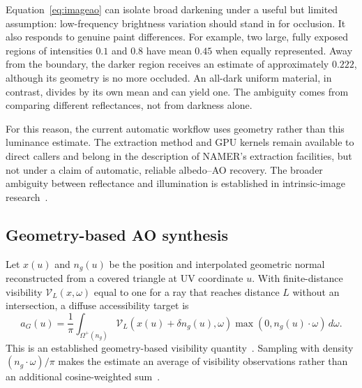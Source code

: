 \documentclass[11pt,letterpaper]{article}
\begin{document}
Equation~\eqref{eq:imageao} can isolate broad darkening under a useful but limited assumption: low-frequency brightness variation should stand in for occlusion. It also responds to genuine paint differences. For example, two large, fully exposed regions of intensities $0.1$ and $0.8$ have mean $0.45$ when equally represented. Away from the boundary, the darker region receives an estimate of approximately $0.222$, although its geometry is no more occluded. An all-dark uniform material, in contrast, divides by its own mean and can yield one. The ambiguity comes from comparing different reflectances, not from darkness alone.

For this reason, the current automatic workflow uses geometry rather than this luminance estimate. The extraction method and GPU kernels remain available to direct callers and belong in the description of NAMER's extraction facilities, but not under a claim of automatic, reliable albedo--AO recovery. The broader ambiguity between reflectance and illumination is established in intrinsic-image research~\cite{barron2015}.

\subsection{Geometry-based AO synthesis}
Let $x(u)$ and $n_g(u)$ be the position and interpolated geometric normal reconstructed from a covered triangle at UV coordinate $u$. With finite-distance visibility $\mathcal V_L(x,\omega)$ equal to one for a ray that reaches distance $L$ without an intersection, a diffuse accessibility target is
\begin{equation}
a_G(u)=\frac{1}{\pi}\int_{\Omega^+(n_g)}
 \mathcal V_L(x(u)+\delta n_g(u),\omega)
 \max(0,n_g(u)\cdot\omega)\,d\omega.
\label{eq:geomao}
\end{equation}
This is an established geometry-based visibility quantity~\cite{pharr2004ao}. Sampling with density $(n_g\cdot\omega)/\pi$ makes the estimate an average of visibility observations rather than an additional cosine-weighted sum~\cite{pbrt2023sampling}.
\end{document}
